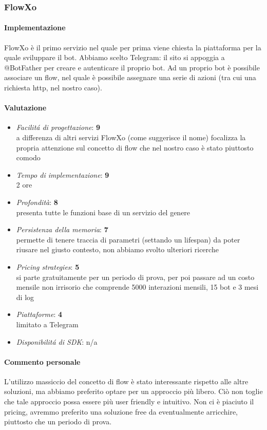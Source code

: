 \documentclass[]{article}
\begin{document}
\subsubsection{FlowXo}
\paragraph{Implementazione}
FlowXo è il primo servizio nel quale per prima viene chiesta la piattaforma per la quale sviluppare il bot. Abbiamo scelto Telegram: il sito si appoggia a @BotFather per creare e autenticare il proprio bot. Ad un proprio bot è possibile associare un flow, nel quale è possibile assegnare una serie di azioni (tra cui una richiesta http, nel nostro caso).
\paragraph{Valutazione}
\begin{itemize}
\item \textit{Facilitá di progettazione}: \textbf{9} \\ a differenza di altri servizi FlowXo (come suggerisce il nome) focalizza la propria attenzione sul concetto di flow che nel nostro caso è stato piuttosto comodo
\item \textit{Tempo di implementazione}: \textbf{9} \\ 2 ore
\item \textit{Profondità}: \textbf{8} \\ presenta tutte le funzioni base di un servizio del genere
\item \textit{Persistenza della memoria}: \textbf{7} \\ permette di tenere traccia di parametri (settando un lifespan) da poter riusare nel giusto contesto, non abbiamo svolto ulteriori ricerche
\item \textit{Pricing strategies}: \textbf{5} \\ si parte gratuitamente per un periodo di prova, per poi passare ad un costo mensile non irrisorio che comprende 5000 interazioni mensili, 15 bot e 3 mesi di log
\item \textit{Piattaforme}: \textbf{4} \\ limitato a Telegram
\item \textit{Disponibilitá di SDK}: n/a
\end{itemize}

\paragraph{Commento personale}
L’utilizzo massiccio del concetto di flow è stato interessante rispetto alle altre soluzioni, ma abbiamo preferito optare per un approccio più libero. Ciò non toglie che tale approccio possa essere più user friendly e intuitivo. Non ci è piaciuto il pricing, avremmo preferito una soluzione free da eventualmente arricchire, piuttosto che un periodo di prova.
\end{document}
